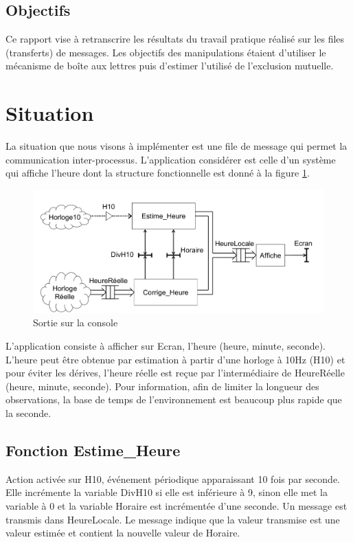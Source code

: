 \documentclass[french]{article}
\begin{document}
	
	\subsection{Objectifs}
	Ce rapport vise à retranscrire les résultats du travail pratique réalisé sur les files (transferts) de messages. Les objectifs des manipulations étaient d'utiliser le mécanisme de boîte aux lettres puis d'estimer l'utilisé de l'exclusion mutuelle.
	
	\newpage
	
	\section{Situation}
	
	
	La situation que nous visons à implémenter est une file de message qui permet la communication inter-processus. L'application considérer est celle d'un système qui affiche l'heure dont la structure fonctionnelle est donné à la figure \ref{fig:structure_fontionnelle}.
	
	\begin{figure}[H]
		\centering
		\includegraphics[width=13cm]{photo/situation}
		\caption{Sortie sur la console}
		\label{fig:structure_fontionnelle}
	\end{figure}
	
	L’application consiste à afficher sur Ecran, l’heure (heure, minute, seconde). L’heure
peut être obtenue par estimation à partir d’une horloge à 10Hz (H10) et pour éviter les
dérives, l’heure réelle est reçue par l’intermédiaire de HeureRéelle (heure, minute, seconde).
	Pour information, afin de limiter la longueur des observations, la base de temps de
l’environnement est beaucoup plus rapide que la seconde.
	

	\subsection*{Fonction Estime\_Heure}
	
	
	Action activée sur H10, événement périodique apparaissant 10 fois par seconde. Elle
incrémente la variable DivH10 si elle est inférieure à 9, sinon elle met la variable à 0 et la
variable Horaire est incrémentée d’une seconde. Un message est transmis dans HeureLocale.
	Le message indique que la valeur transmise est une valeur estimée et contient la nouvelle	valeur de Horaire.
	
\end{document}
